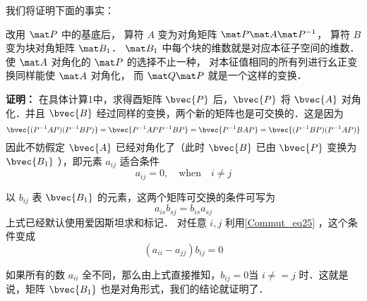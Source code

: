 
我们将证明下面的事实：

改用 $\mat P$ 中的基底后， 算符 $A$ 变为对角矩阵 $\mat P \mat A\mat P^{-1}$， 算符 $B$ 变为块对角矩阵 $\mat B_1$． $\mat B_1$ 中每个块的维数就是对应本征子空间的维数． 使 $\mat A$ 对角化的 $\mat P$ 的选择不止一种， 对本征值相同的所有列进行幺正变换同样能使 $\mat A$ 对角化， 而 $\mat Q\mat P$ 就是一个这样的变换．

\textbf{证明：}
在具体计算1中，求得酉矩阵 $\bvec{P}$ 后，$\bvec{P}$ 将 $\bvec{A}$ 对角化．并且 $\bvec{B}$ 经过同样的变换，两个新的矩阵也是可交换的．这是因为
\begin{equation}
\bvec{(P^{-1}AP)(P^{-1}BP)}=\bvec{P^{-1}APP^{-1}BP}=\bvec{P^{-1}BAP}=\bvec{(P^{-1}BP)(P^{-1}AP)}
\end{equation}
因此不妨假定 $\bvec{A}$ 已经对角化了（此时 $\bvec{B}$ 已由 $\bvec{P}$ 变换为 $\bvec{B_1}$ ），即元素 $a_{ij}$ 适合条件
\begin{equation}
a_{ij}=0,\quad \mathrm{when} \quad i\neq j
\label{Commut_eq25}
\end{equation}

以 $b_{ij}$ 表 $\bvec{B_1}$ 的元素，这两个矩阵可交换的条件可写为
\begin{equation}
a_{is}b_{sj}=b_{is}a_{sj}
\end{equation}
上式已经默认使用爱因斯坦求和标记．
对任意 $i,j$ 利用\autoref{Commut_eq25} ，这个条件变成
\begin{equation}
(a_{ii}-a_{jj})b_{ij}=0
\label{Commut_eq27}
\end{equation}

如果所有的数 $a_{ii}$ 全不同，那么由上式直接推知，$b_{ij}=0$当 $i\neq=j$ 时．这就是说，矩阵 $\bvec{B_1}$ 也是对角形式，我们的结论就证明了．


